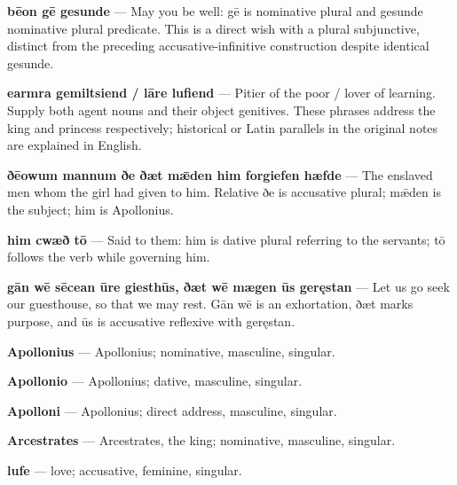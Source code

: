 \textbf{bēon gē gesunde} — May you be well: gē is nominative plural and gesunde nominative plural predicate. This is a direct wish with a plural subjunctive, distinct from the preceding accusative-infinitive construction despite identical gesunde.

\textbf{earmra gemiltsiend /\allowbreak{} lāre lufiend} — Pitier of the poor /\allowbreak{} lover of learning. Supply both agent nouns and their object genitives. These phrases address the king and princess respectively; historical or Latin parallels in the original notes are explained in English.

\textbf{ðēowum mannum ðe ðæt mǣden him forgiefen hæfde} — The enslaved men whom the girl had given to him. Relative ðe is accusative plural; mǣden is the subject; him is Apollonius.

\textbf{him cwæð tō} — Said to them: him is dative plural referring to the servants; tō follows the verb while governing him.

\textbf{gān wē sēcean ūre giesthūs, ðæt wē mægen ūs geręstan} — Let us go seek our guesthouse, so that we may rest. Gān wē is an exhortation, ðæt marks purpose, and ūs is accusative reflexive with geręstan.

\textbf{Apollonius} — Apollonius; nominative, masculine, singular.

\textbf{Apollonio} — Apollonius; dative, masculine, singular.

\textbf{Apolloni} — Apollonius; direct address, masculine, singular.

\textbf{Arcestrates} — Arcestrates, the king; nominative, masculine, singular.

\textbf{lufe} — love; accusative, feminine, singular.

